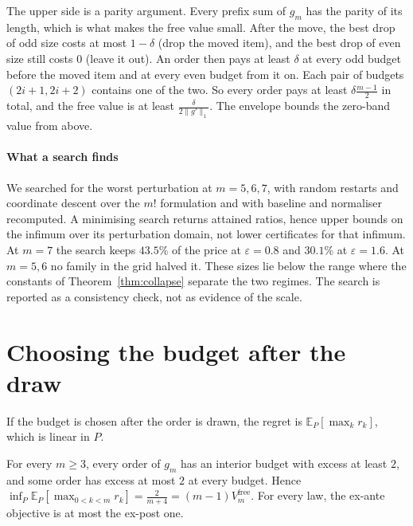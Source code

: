 The upper side is a parity argument. Every prefix sum of $g_{m}$ has the parity of its
length, which is what makes the free value small. After the move, the best drop of odd size
costs at most $1-\delta$ (drop the moved item), and the best drop of even size still costs
$0$ (leave it out). An order then pays at least $\delta$ at every odd budget before the moved
item and at every even budget from it on. Each pair of budgets $(2i+1,2i+2)$ contains one of
the two. So every order pays at least $\delta\frac{m-1}{2}$ in total, and the free value is at
least $\frac{\delta}{2\|g'\|_{1}}$. The envelope bounds the zero-band value from above.

\paragraph{What a search finds}
We searched for the worst perturbation at $m=5,6,7$, with random restarts and coordinate
descent over the $m!$ formulation and with baseline and normaliser recomputed. A minimising search returns
attained ratios, hence upper bounds on the infimum over its perturbation domain, not lower
certificates for that infimum. At $m=7$ the search keeps $43.5\%$
of the price at $\varepsilon=0.8$ and $30.1\%$ at $\varepsilon=1.6$. At $m=5,6$ no family in
the grid halved it. \NUM{} These sizes lie below the range where the constants of
Theorem~\ref{thm:collapse} separate the two regimes. The search is reported as a consistency
check, not as evidence of the scale.

\section{Choosing the budget after the draw}
\label{sec:expost}

If the budget is chosen after the order is drawn, the regret is
$\mathbb{E}_{P}[\max_{k}r_{k}]$, which is linear in $P$.

\begin{proposition}
\label{prop:expost}
For every $m\ge3$, every order of $g_{m}$ has an interior budget with excess at least $2$,
and some order has excess at most $2$ at every budget. Hence
$\inf_{P}\mathbb{E}_{P}[\max_{0<k<m}r_{k}]=\frac{2}{m+4}=(m-1)V^{\mathrm{free}}_{m}$. For
every law, the ex-ante objective is at most the ex-post one.
\end{proposition}


